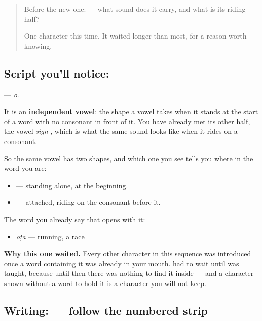 \label{lesson:KA-S125-letter-oo}



\begin{quote}
Before the new one:  — what sound does it carry, and what is its riding half?

One character this time. It waited longer than most, for a reason worth knowing.
\end{quote}

\subsection*{Script you'll notice: }
\textbf{} — \emph{ō}.

It is an \textbf{independent vowel}: the shape a vowel takes when it stands at the start of a word with no consonant in front of it. You have already met its other half, the vowel \emph{sign} , which is what the same sound looks like when it rides on a consonant.

So the same vowel has two shapes, and which one you see tells you where in the word you are:

\begin{itemize}
\raggedright
  \item \textbf{} — standing alone, at the beginning.
  \item \textbf{} — attached, riding on the consonant before it.
\end{itemize}

The word you already say that opens with it:

\begin{itemize}
\raggedright
  \item \textbf{} \emph{ōṭa} — running, a race
\end{itemize}

\textbf{Why this one waited.} Every other character in this sequence was introduced once a word containing it was already in your mouth.  had to wait until  was taught, because until then there was nothing to find it inside — and a character shown without a word to hold it is a character you will not keep.

\subsection*{Writing:  — follow the numbered strip}

